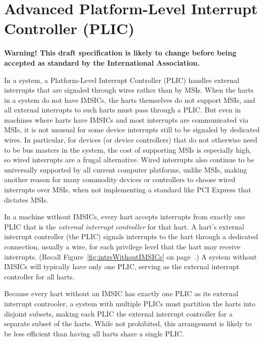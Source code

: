 
\chapter{Advanced Platform-Level Interrupt Controller (PLIC)}
\label{ch:AdvPLIC}

\textbf{%
Warning!
This draft specification is likely to change before being accepted as
standard by the {\RISCV} International Association.%
}
\bigskip

In a {\RISCV} system, a Platform-Level Interrupt Controller (PLIC)
handles external interrupts that are signaled through wires rather than
by MSIs.
When the {\RISCV} harts in a system do not have IMSICs, the harts
themselves do not support MSIs, and all external interrupts to such
harts must pass through a PLIC.
But even in machines where harts have IMSICs and most interrupts are
communicated via MSIs, it is not unusual for some device interrupts
still to be signaled by dedicated wires.
In particular, for devices (or device controllers) that do not
otherwise need to be bus masters in the system, the cost of supporting
MSIs is especially high, so wired interrupts are a frugal alternative.
Wired interrupts also continue to be universally supported by all
current computer platforms, unlike MSIs, making another reason for many
commodity devices or controllers to choose wired interrupts over MSIs,
when not implementing a standard like PCI Express that dictates MSIs.

In a machine without IMSICs, every {\RISCV} hart accepts interrupts
from exactly one PLIC that is the \emph{external interrupt controller}
for that hart.
A hart's external interrupt controller (the PLIC) signals interrupts
to the hart through a dedicated connection, usually a wire, for each
privilege level that the hart may receive interrupts.
(Recall Figure~\ref{fig:intrsWithoutIMSICs} on
page~\pageref{fig:intrsWithoutIMSICs}.)
A system without IMSICs will typically have only one PLIC, serving as
the external interrupt controller for all {\RISCV} harts.

\begin{commentary}
Because every {\RISCV} hart without an IMSIC has exactly one PLIC
as its external interrupt controoler, a system with multiple PLICs
must partition the harts into disjoint subsets, making each PLIC the
external interrupt controller for a separate subset of the harts.
While not prohibited, this arrangement is likely to be less efficient
than having all harts share a single PLIC.
\end{commentary}

